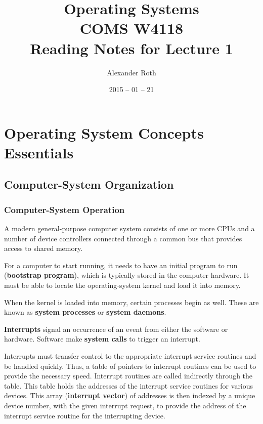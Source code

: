 \documentclass[]{article}
\begin{document}
\newtheorem{thm}{Theorem}
\title{Operating Systems \\ COMS W4118 \\ Reading Notes for Lecture 1}
\author{Alexander Roth}
\date{2015 -- 01 -- 21}
\maketitle

\section*{Operating System Concepts Essentials}

\subsection*{Computer-System Organization}

\subsubsection*{Computer-System Operation}
A modern general-purpose computer system consists of one or more CPUs and a
number of device controllers connected through a common bus that provides access
to shared memory.

For a computer to start running, it needs to have an initial program to run
(\textbf{bootstrap program}), which is typically stored in the computer
hardware. It must be able to locate the operating-system kernel and load it into
memory.

When the kernel is loaded into memory, certain processes begin as well. These
are known as \textbf{system processes} or \textbf{system daemons}.

\textbf{Interrupts} signal an occurrence of an event from either the software or
hardware. Software make \textbf{system calls} to trigger an interrupt.

Interrupts must transfer control to the appropriate interrupt service routines
and be handled quickly. Thus, a table of pointers to interrupt routines can be
used to provide the necessary speed. Interrupt routines are called indirectly
through the table. This table holds the addresses of the interrupt service
routines for various devices. This array (\textbf{interrupt vector}) of
addresses is then indexed by a unique device number, with the given interrupt
request, to provide the address of the interrupt service routine for the
interrupting device.
\end{document}
